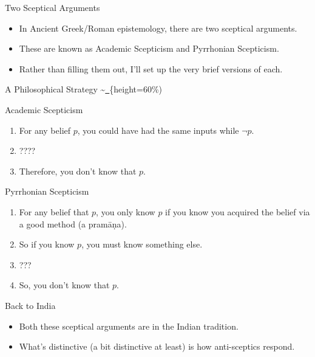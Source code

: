 \documentclass[
  17pt,
  letterpaper,
  ignorenonframetext,
  aspectratio=169,
  handout]{beamer}
\providecommand{\tightlist}{%
  \setlength{\itemsep}{0pt}\setlength{\parskip}{0pt}}\usepackage{longtable,booktabs,array}
\begin{document}
\begin{frame}{Two Sceptical Arguments}
\protect\hypertarget{two-sceptical-arguments}{}
\begin{itemize}[<+->]
\tightlist
\item
  In Ancient Greek/Roman epistemology, there are two sceptical
  arguments.
\item
  These are known as Academic Scepticism and Pyrrhonian Scepticism.
\item
  Rather than filling them out, I'll set up the very brief versions of
  each.
\end{itemize}
\end{frame}

\begin{frame}{A Philosophical Strategy}
\protect\hypertarget{a-philosophical-strategy}{}
\textasciitilde{}\href{../images/underpants.jpeg}{~}\{height=60\%)
\end{frame}

\begin{frame}{Academic Scepticism}
\protect\hypertarget{academic-scepticism}{}
\begin{enumerate}[<+->]
\tightlist
\item
  For any belief \(p\), you could have had the same inputs while
  \(\neg p\).
\item
  ????
\item
  Therefore, you don't know that \(p\).
\end{enumerate}
\end{frame}

\begin{frame}{Pyrrhonian Scepticism}
\protect\hypertarget{pyrrhonian-scepticism}{}
\begin{enumerate}[<+->]
\tightlist
\item
  For any belief that \(p\), you only know \(p\) if you know you
  acquired the belief via a good method (a pramāṇa).
\item
  So if you know \(p\), you must know something else.
\item
  ???
\item
  So, you don't know that \(p\).
\end{enumerate}
\end{frame}

\begin{frame}{Back to India}
\protect\hypertarget{back-to-india}{}
\begin{itemize}[<+->]
\tightlist
\item
  Both these sceptical arguments are in the Indian tradition.
\item
  What's distinctive (a bit distinctive at least) is how anti-sceptics
  respond.
\end{itemize}
\end{frame}
\end{document}
